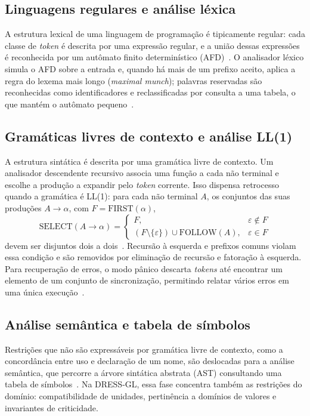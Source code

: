 \documentclass[conference]{IEEEtran}
\begin{document}
\subsection{Linguagens regulares e análise léxica}
\label{sec:lexica}

A estrutura lexical de uma linguagem de programação é tipicamente regular:
cada classe de \textit{token} é descrita por uma expressão regular, e a união
dessas expressões é reconhecida por um autômato finito determinístico
(AFD)~\cite{hopcroft2007}. O analisador léxico simula o AFD sobre a entrada e,
quando há mais de um prefixo aceito, aplica a regra do lexema mais longo
(\textit{maximal munch}); palavras reservadas são reconhecidas como
identificadores e reclassificadas por consulta a uma tabela, o que mantém o
autômato pequeno~\cite{aho2007}.

\subsection{Gramáticas livres de contexto e análise LL(1)}
\label{sec:ll1}

A estrutura sintática é descrita por uma gramática livre de contexto. Um
analisador descendente recursivo associa uma função a cada não terminal e
escolhe a produção a expandir pelo \textit{token} corrente. Isso dispensa
retrocesso quando a gramática é LL(1): para cada não terminal $A$, os conjuntos
das suas produções $A \to \alpha$, com $F = \mathrm{FIRST}(\alpha)$,
\begin{equation*}
\mathrm{SELECT}(A \to \alpha) =
\begin{cases}
F, & \varepsilon \notin F\\
(F \setminus \{\varepsilon\}) \cup \mathrm{FOLLOW}(A), & \varepsilon \in F
\end{cases}
\end{equation*}
devem ser disjuntos dois a dois~\cite{aho2007}. Recursão à esquerda e prefixos
comuns violam essa condição e são removidos por eliminação de recursão e
fatoração à esquerda. Para recuperação de erros, o modo pânico descarta
\textit{tokens} até encontrar um elemento de um conjunto de sincronização,
permitindo relatar vários erros em uma única execução~\cite{aho2007}.

\subsection{Análise semântica e tabela de símbolos}
\label{sec:semantica-teoria}

Restrições que não são expressáveis por gramática livre de contexto, como a
concordância entre uso e declaração de um nome, são deslocadas para a análise
semântica, que percorre a árvore sintática abstrata (AST) consultando uma
tabela de símbolos~\cite{aho2007}. Na DRESS-GL, essa fase concentra também as
restrições do domínio: compatibilidade de unidades, pertinência a domínios de
valores e invariantes de criticidade.
\end{document}
